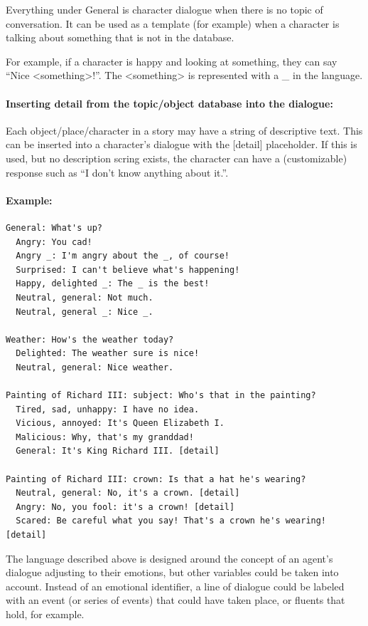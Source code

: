 \documentclass[11pt]{report}
\begin{document}
Everything under General is character dialogue when there is no topic of conversation. It can be used as a template (for example) when a character is talking about something that is not in the database.

For example, if a character is happy and looking at something, they can say “Nice <something>!”. The <something> is represented with a _ in the language.

\paragraph{Inserting detail from the topic/object database into the dialogue:}

Each object/place/character in a story may have a string of descriptive text. This can be inserted into a character’s dialogue with the [detail] placeholder. If this is used, but no description scring exists, the character can have a (customizable) response such as “I don’t know anything about it.”.

\paragraph{Example:}

\begin{lstlisting}[showstringspaces=false]
General: What's up?
  Angry: You cad!
  Angry _: I'm angry about the _, of course!
  Surprised: I can't believe what's happening!
  Happy, delighted _: The _ is the best!
  Neutral, general: Not much.
  Neutral, general _: Nice _.

Weather: How's the weather today?
  Delighted: The weather sure is nice!
  Neutral, general: Nice weather.

Painting of Richard III: subject: Who's that in the painting?
  Tired, sad, unhappy: I have no idea.
  Vicious, annoyed: It's Queen Elizabeth I.
  Malicious: Why, that's my granddad!
  General: It's King Richard III. [detail]

Painting of Richard III: crown: Is that a hat he's wearing?
  Neutral, general: No, it's a crown. [detail]
  Angry: No, you fool: it's a crown! [detail]
  Scared: Be careful what you say! That's a crown he's wearing! [detail]
\end{lstlisting}

The language described above is designed around the concept of an agent's
dialogue adjusting to their emotions, but other variables could be taken into
account. Instead of an emotional identifier, a line of dialogue could be labeled
with an event (or series of events) that could have taken place, or fluents that
hold, for example.
\end{document}
